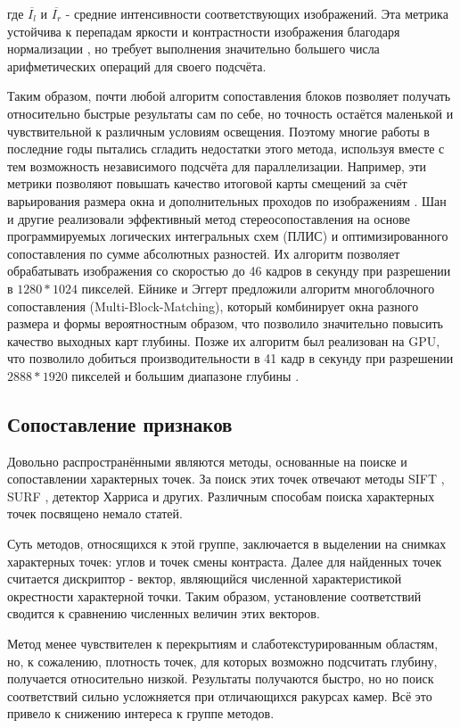 где $\overline{I_l}$ и $\overline{I_r}$ - средние интенсивности соответствующих изображений. Эта метрика устойчива к перепадам яркости и контрастности изображения благодаря нормализации \cite{ncceval}, 
но требует выполнения значительно большего числа арифметических операций для своего подсчёта. 

Таким образом, почти любой алгоритм сопоставления блоков позволяет получать относительно быстрые результаты сам по себе, но точность остаётся маленькой и чувствительной к различным условиям освещения. Поэтому многие 
работы в последние годы пытались сгладить недостатки этого метода, используя вместе с тем возможность независимого  подсчёта для параллелизации.    
Например, эти метрики позволяют повышать качество итоговой карты смещений за счёт варьирования размера окна и дополнительных проходов по изображениям \cite{twosizewindow}. 
Шан и другие \cite{SAD_FPGA} реализовали эффективный метод стереосопоставления на основе программируемых логических интегральных схем (ПЛИС) и оптимизированного сопоставления по сумме абсолютных разностей. 
Их алгоритм позволяет обрабатывать изображения со скоростью до 46 кадров в секунду при разрешении в $1280*1024$ пикселей. Ейнике и Эггерт \cite{multiblock} предложили алгоритм многоблочного сопоставления (Multi-Block-Matching), который комбинирует окна разного размера и формы вероятностным образом, что позволило значительно 
повысить качество выходных карт глубины. Позже их алгоритм был реализован на GPU, что позволило добиться производительности в 41 кадр в секунду при разрешении $2888*1920$ пикселей и 
большим диапазоне глубины \cite{multiblock_gpu}. 

\subsection{Сопоставление признаков}
Довольно распространёнными являются методы, основанные на поиске и сопоставлении характерных точек. За поиск этих точек отвечают методы 
SIFT \cite{sift}, SURF \cite{surf}, детектор Харриса и других. Различным способам поиска характерных точек посвящено немало статей. 

Суть методов, относящихся к этой группе, заключается в выделении на снимках характерных точек: углов и точек смены контраста. Далее 
для найденных точек считается дискриптор - вектор, являющийся численной характеристикой окрестности характерной точки. Таким образом,
установление соответствий сводится к сравнению численных величин этих векторов. 

Метод менее чувствителен к перекрытиям и слаботекстурированным областям, 
но, к сожалению, плотность точек, для которых возможно подсчитать глубину, получается относительно низкой. Результаты получаются быстро, но 
но поиск соответствий сильно усложняется при отличающихся ракурсах камер. Всё это привело к снижению интереса к группе методов.

